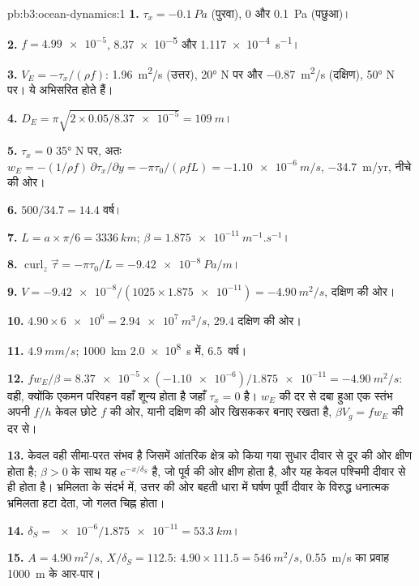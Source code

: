 \begin{solution}{pb:b3:ocean-dynamics:1}
\textbf{1.} $\tau_x = \qty{-0.1}{Pa}$ (पुरवा), 0 और \qty{+0.1}{Pa}
(पछुआ)।

\textbf{2.} $f = \num{4.99e-5}$, \num{8.37e-5} और
\qty{1.117e-4}{s^{-1}}।

\textbf{3.} $V_E = -\tau_x/(\rho f)$: \qty{+1.96}{m^2/s} (उत्तर), \ang{20} N पर
और \qty{-0.87}{m^2/s} (दक्षिण), \ang{50} N पर। ये अभिसरित होते हैं।

\textbf{4.} $D_E = \pi\sqrt{2\times0.05/\num{8.37e-5}} = \qty{109}{m}$।

\textbf{5.} $\tau_x = 0$ \ang{35} N पर, अतः $w_E = -(1/\rho f)\,
\partial\tau_x/\partial y = -\pi\tau_0/(\rho fL) = \qty{-1.10e-6}{m/s}$,
\qty{-34.7}{m/yr}, नीचे की ओर।

\textbf{6.} $500/34.7 = \num{14.4}\text{ वर्ष}$।

\textbf{7.} $L = a\times\pi/6 = \qty{3336}{km}$; $\beta =
\qty{1.875e-11}{m^{-1}.s^{-1}}$।

\textbf{8.} $\operatorname{curl}_z\vec\tau = -\pi\tau_0/L =
\qty{-9.42e-8}{Pa/m}$।

\textbf{9.} $V = \num{-9.42e-8}/(1025\times\num{1.875e-11}) =
\qty{-4.90}{m^2/s}$, दक्षिण की ओर।

\textbf{10.} $4.90\times\num{6e6} = \qty{2.94e7}{m^3/s}$,
\qty{29.4}{\sverdrup} दक्षिण की ओर।

\textbf{11.} $\qty{4.9}{mm/s}$; \qty{1000}{km} \qty{2.0e8}{s} में,
\num{6.5}~वर्ष।

\textbf{12.} $fw_E/\beta = \num{8.37e-5}\times(\num{-1.10e-6})/
\num{1.875e-11} = \qty{-4.90}{m^2/s}$: वही, क्योंकि एकमन
परिवहन वहाँ शून्य होता है जहाँ $\tau_x = 0$ है। $w_E$ की दर से दबा हुआ एक स्तंभ
अपनी  $f/h$ केवल छोटे $f$ की ओर, यानी दक्षिण की ओर
खिसककर बनाए रखता है, $\beta V_g = fw_E$ की दर से।

\textbf{13.} केवल वही सीमा-परत संभव है जिसमें आंतरिक क्षेत्र को किया गया सुधार
दीवार से दूर की ओर क्षीण होता है; $\beta > 0$ के साथ यह
$\mathrm e^{-x/\delta_S}$ है, जो पूर्व की ओर क्षीण होता है, और यह
केवल पश्चिमी दीवार से ही होता है। भ्रमिलता के संदर्भ में, उत्तर की ओर बहती धारा में घर्षण
पूर्वी दीवार के विरुद्ध धनात्मक भ्रमिलता हटा देता, जो गलत चिह्न होता।

\textbf{14.} $\delta_S = \num{e-6}/\num{1.875e-11} = \qty{53.3}{km}$।

\textbf{15.} $A = \qty{4.90}{m^2/s}$, $X/\delta_S = 112.5$:
$4.90\times111.5 = \qty{546}{m^2/s}$, \qty{0.55}{m/s} का प्रवाह
\qty{1000}{m} के आर-पार।


\end{solution}
